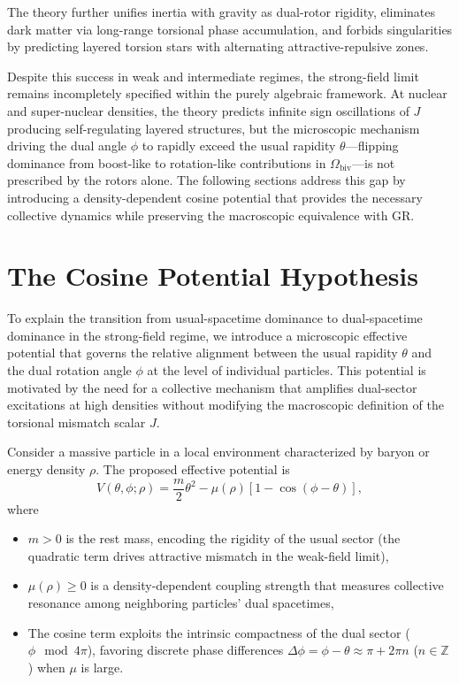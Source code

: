 \documentclass[a4paper]{article}
\begin{document}
The theory further unifies inertia with gravity as dual-rotor rigidity, eliminates dark matter via long-range torsional phase accumulation, and forbids singularities by predicting layered torsion stars with alternating attractive-repulsive zones.

Despite this success in weak and intermediate regimes, the strong-field limit remains incompletely specified within the purely algebraic framework. At nuclear and super-nuclear densities, the theory predicts infinite sign oscillations of $J$ producing self-regulating layered structures, but the microscopic mechanism driving the dual angle $\phi$ to rapidly exceed the usual rapidity $\theta$—flipping dominance from boost-like to rotation-like contributions in $\Omega_\text{biv}$—is not prescribed by the rotors alone. The following sections address this gap by introducing a density-dependent cosine potential that provides the necessary collective dynamics while preserving the macroscopic equivalence with GR.

\section{The Cosine Potential Hypothesis}
\label{sec:cosine}

To explain the transition from usual-spacetime dominance to dual-spacetime dominance in the strong-field regime, we introduce a microscopic effective potential that governs the relative alignment between the usual rapidity $\theta$ and the dual rotation angle $\phi$ at the level of individual particles. This potential is motivated by the need for a collective mechanism that amplifies dual-sector excitations at high densities without modifying the macroscopic definition of the torsional mismatch scalar $J$.

Consider a massive particle in a local environment characterized by baryon or energy density $\rho$. The proposed effective potential is
\[
V(\theta, \phi; \rho) = \frac{m}{2} \theta^2 - \mu(\rho) \left[ 1 - \cos(\phi - \theta) \right],
\]
where
\begin{itemize}
  \item $m > 0$ is the rest mass, encoding the rigidity of the usual sector (the quadratic term drives attractive mismatch in the weak-field limit),
  \item $\mu(\rho) \geq 0$ is a density-dependent coupling strength that measures collective resonance among neighboring particles' dual spacetimes,
  \item The cosine term exploits the intrinsic compactness of the dual sector ($\phi \mod 4\pi$), favoring discrete phase differences $\Delta\phi = \phi - \theta \approx \pi + 2\pi n$ ($n \in \mathbb{Z}$) when $\mu$ is large.
\end{itemize}
\end{document}
